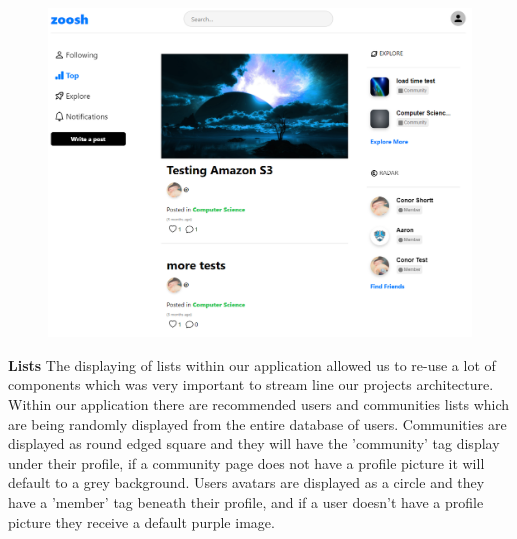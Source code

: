 \begin{figure}[H]
  \centering
  \includegraphics[scale=0.35]{img/top.PNG}
  \label{fig:Top Posts Feed.}
\end{figure}

\newpage
\textbf{Lists}
\newline
The displaying of lists within our application allowed us to re-use a lot of components which was very important to stream line our projects architecture. Within our application there are recommended users and communities lists which are being randomly displayed from the entire database of users. Communities are displayed as round edged square and they will have the 'community' tag display under their profile, if a community page does not have a profile picture it will default to a grey background. Users avatars are displayed as a circle and they have a 'member' tag beneath their profile, and if a user doesn't have a profile picture they receive a default purple image.

